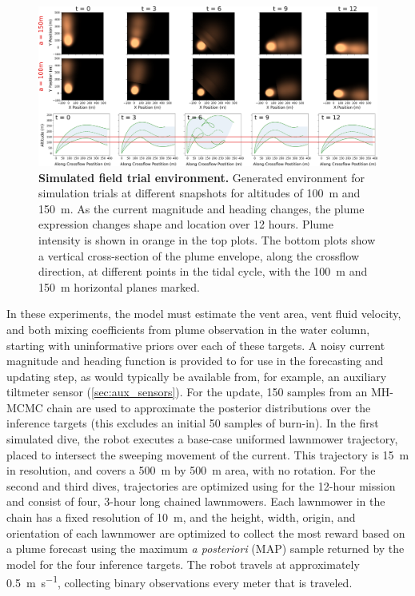 \begin{figure}[h!]
    \centering
    \includegraphics[width=1\columnwidth]{figures/sim_env.png}
    \caption{\textbf{Simulated field trial environment.} Generated environment for simulation trials at different snapshots for altitudes of \SI{100}{\meter} and \SI{150}{\meter}. As the current magnitude and heading changes, the plume expression changes shape and location over 12 hours. Plume intensity is shown in orange in the top plots. The bottom plots show a vertical cross-section of the plume envelope, along the crossflow direction, at different points in the tidal cycle, with the \SI{100}{\meter} and \SI{150}{\meter} horizontal planes marked.}
    \label{fig:sim_env}
\end{figure}

In these experiments, the \PHUMES model must estimate the vent area, vent fluid velocity, and both mixing coefficients from plume observation in the water column, starting with uninformative priors over each of these targets. A noisy current magnitude and heading function is provided to \PHUMES for use in the forecasting and updating step, as would typically be available from, for example, an auxiliary tiltmeter sensor (\cref{sec:aux_sensors}). For the \PHUMES update, 150 samples from an MH-MCMC chain are used to approximate the posterior distributions over the inference targets (this excludes an initial 50 samples of burn-in). In the first simulated dive, the robot executes a base-case uniformed lawnmower trajectory, placed to intersect the sweeping movement of the current. This trajectory is \SI{15}{\meter} in resolution, and covers a \SI{500}{\meter} by \SI{500}{\meter} area, with no rotation. For the second and third dives, trajectories are optimized using \PHORTEX for the 12-hour mission and consist of four, 3-hour long chained lawnmowers. Each lawnmower in the chain has a fixed resolution of \SI{10}{\meter}, and the height, width, origin, and orientation of each lawnmower are optimized to collect the most reward based on a plume forecast using the maximum \emph{a posteriori} (MAP) sample returned by the \PHUMES model for the four inference targets. The robot travels at approximately \SI{0.5}{\meter\per\second}, collecting binary observations every meter that is traveled. 

